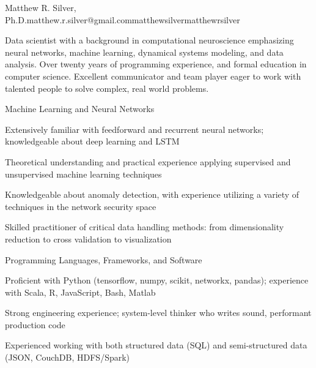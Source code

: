 \documentclass{report}
\begin{document}

  \begin{resume_header}{Matthew R. Silver, Ph.D.}{matthew.r.silver@gmail.com}{}{matthewsilver}{matthewrsilver}

    Data scientist with a background in computational neuroscience emphasizing neural networks, machine learning, dynamical systems modeling, and data analysis. Over twenty years of programming experience, and formal education in computer science. Excellent communicator and team player eager to work with talented people to solve complex, real world problems.

  \end{resume_header}





  \begin{skillset}{Machine Learning and Neural Networks}
    \item Extensively familiar with feedforward and recurrent neural networks; knowledgeable about deep learning and LSTM
    \item Theoretical understanding and practical experience applying supervised and unsupervised machine learning techniques
    \item Knowledgeable about anomaly detection, with experience utilizing a variety of techniques in the network security space
    \item Skilled practitioner of critical data handling methods: from dimensionality reduction to cross validation to visualization
  \end{skillset}

  \begin{skillset}{Programming Languages, Frameworks, and Software}
    \item Proficient with Python (tensorflow, numpy, scikit, networkx, pandas); experience with Scala, R, JavaScript, Bash, Matlab
    \item Strong \CC{} engineering experience; system-level thinker who writes sound, performant production code
    \item Experienced working with both structured data (SQL) and semi-structured data (JSON, CouchDB, HDFS/Spark)
  \end{skillset}
\end{document}
